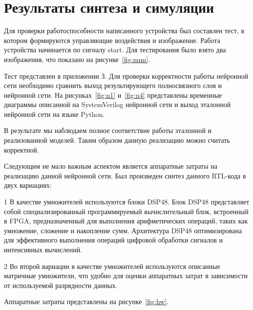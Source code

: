 \section{Результаты синтеза и симуляции}
\hspace*{12.5 mm}Для проверки работоспособности написанного устройства был 
составлен тест, в котором формируются управляющие воздействия и изображение. 
Работа устройства начинается по сигналу start. Для тестирования было взято два 
изображения, что показано на рисунке~\ref{fig:num}.


Тест представлен в приложении З. Для проверки корректности работы нейронной 
сети необходимо сравнить выход результирующего полносвязного слоя и нейронной 
сети. На рисунках~\ref{fig:n1} и~\ref{fig:n4} представлены временные диаграммы 
описанной на SystemVerilog нейронной сети и выход эталонной нейронной сети на 
языке Python.


В результате мы наблюдаем полное соответствие работы эталонной и реализованной 
моделей. Таким образом данную реализацию можно считать корректной. 

Следующим не мало важным аспектом является аппаратные затраты на реализацию 
данной нейронной сети. Был произведен синтез данного RTL-кода в двух вариациях:

  1 В качестве умножителей используются блоки DSP48. Блок DSP48 представляет 
собой специализированный программируемый вычислительный блок, встроенный в FPGA, 
предназначенный для выполнения арифметических операций, таких как умножение, 
сложение и накопление сумм. Архитектура DSP48 оптимизирована для эффективного 
выполнения операций цифровой обработки сигналов и интенсивных вычислений.

  2 Во второй вариации в качестве умножителей используются описанные матричные 
умножители, что удобно для оценки аппаратных затрат в зависимости от 
используемой разрядности данных.

Аппаратные затраты представлены на рисунке~\ref{fig:hw}.


